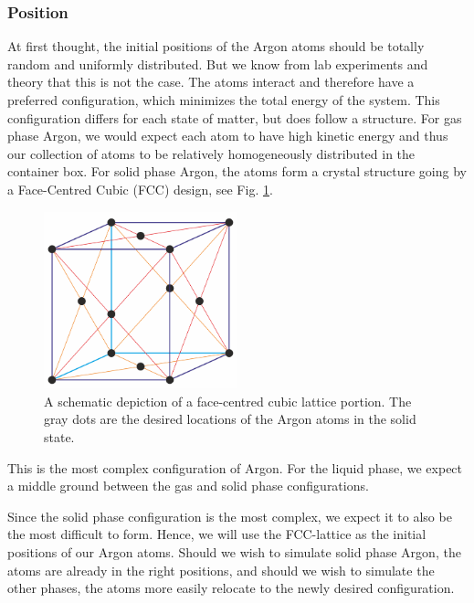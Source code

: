 \documentclass{IAYCPro}
\begin{document}
\raggedbottom
\newpage

\subsubsection{Position}

At first thought, the initial positions of the Argon atoms should be totally random and uniformly distributed. But we know from lab experiments and theory that this is not the case. The atoms interact and therefore have a preferred configuration, which minimizes the total energy of the system. This configuration differs for each state of matter, but does follow a structure. For gas phase Argon, we would expect each atom to have high kinetic energy and thus our collection of atoms to be relatively homogeneously distributed in the container box. For solid phase Argon, the atoms form a crystal structure going by a Face-Centred Cubic (FCC) design, see Fig. \ref{fig: FCC}. 

\begin{figure}[H]
    \centering
    \includegraphics[width=0.5\textwidth]{figs/FCC.png}
    \caption{A schematic depiction of a face-centred cubic lattice portion. The gray dots are the desired locations of the Argon atoms in the solid state.}
    \label{fig: FCC}
\end{figure}

This is the most complex configuration of Argon. For the liquid phase, we expect a middle ground between the gas and solid phase configurations. 

Since the solid phase configuration is the most complex, we expect it to also be the most difficult to form. Hence, we will use the FCC-lattice as the initial positions of our Argon atoms. Should we wish to simulate solid phase Argon, the atoms are already in the right positions, and should we wish to simulate the other phases, the atoms more easily relocate to the newly desired configuration.
\end{document}
